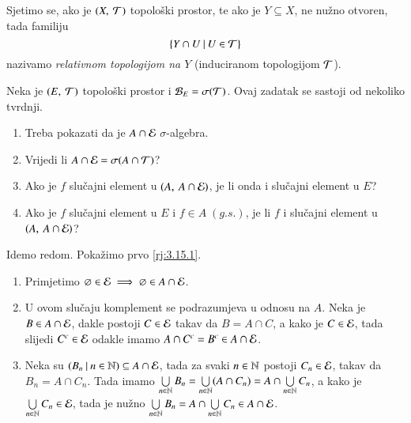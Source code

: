 \begin{nap} \label{nap:3.15-1}
    Sjetimo se, ako je $({X}, \: {\mathcal{T}})$ topolo\v ski prostor, te ako je $Y \subseteq X$, ne nu\v zno otvoren, tada familiju
    \begin{equation*}
        \{{Y \cap U} \: | \: {U \in \mathcal{T}}\}
    \end{equation*}
    nazivamo \emph{relativnom topologijom na $Y$} (induciranom topologijom $\mathcal{T}$).
\end{nap}

\begin{rj}  \label{rj:3.15}
    Neka je $({E}, \: {\mathcal{T}})$ topolo\v ski prostor i $\mathcal{B}_{E} = \sigma({\mathcal{T}})$.
    Ovaj zadatak se sastoji od nekoliko tvrdnji.
    \begin{enumerate}[label=(\arabic*)]
        \item \label{rj:3.15.1}
        Treba pokazati da je $ A \cap \mathcal{E}$ $\sigma$-algebra.
        \item \label{rj:3.15.2}
        Vrijedi li $A \cap \mathcal{E} = \sigma({A \cap \mathcal{T}})$?
        \item \label{rj:3.15.3}
        Ako je $f$ slu\v cajni element u $({A}, \: {A \cap \mathcal{E}})$, je li onda i slu\v cajni element u $E$?
        \item \label{rj:3.15.4}
        Ako je $f$ slu\v cajni element u $E$ i $f \in A \; (g.s.)$, je li $f$ i slu\v cajni element u $({A}, \: {A \cap \mathcal{E}})$?
    \end{enumerate}
    Idemo redom.
    Poka\v zimo prvo \ref{rj:3.15.1}.
    \begin{enumerate}[label=(\roman*)]
        \item Primjetimo $\varnothing \in \mathcal{E} \implies \varnothing \in A \cap \mathcal{E}$.
        \item U ovom slu\v caju komplement se podrazumjeva u odnosu na $A$.
        Neka je $B \in A \cap \mathcal{E}$, dakle postoji $C \in \mathcal{E}$ takav da $B = A \cap C$, a kako je $C \in \mathcal{E}$, tada slijedi $C^c \in \mathcal{E}$ odakle imamo $A \cap C^c = B^c \in A \cap \mathcal{E}$.
        \item Neka su $({B_n} \: | \: {n \in \mathbb{N}}) \subseteq A \cap \mathcal{E}$, tada za svaki $n \in \mathbb{N}$ postoji $C_n \in \mathcal{E}$, takav da $B_n = A \cap C_n$.
        Tada imamo $\bigcup\limits_{n \in \mathbb{N}}^{} B_n = \bigcup\limits_{n \in \mathbb{N}}^{} (A \cap C_n) = A \cap \bigcup\limits_{n \in \mathbb{N}}^{} C_n$, a kako je $\bigcup\limits_{n \in \mathbb{N}}^{} C_n \in \mathcal{E}$, tada je nu\v zno $\bigcup\limits_{n \in \mathbb{N}}^{} B_n = A \cap \bigcup\limits_{n \in \mathbb{N}}^{} C_n \in A \cap \mathcal{E}$.
    \end{enumerate}


\end{rj}
